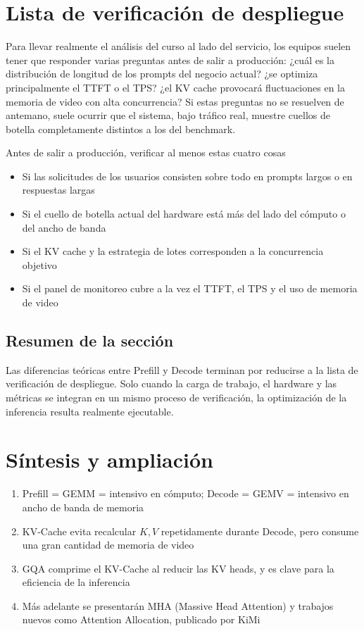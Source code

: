 \documentclass[a4paper]{article}
\begin{document}
\newpage
\section{Lista de verificación de despliegue}
Para llevar realmente el análisis del curso al lado del servicio, los equipos suelen tener que responder varias preguntas antes de salir a producción: ¿cuál es la distribución de longitud de los prompts del negocio actual? ¿se optimiza principalmente el TTFT o el TPS? ¿el KV cache provocará fluctuaciones en la memoria de video con alta concurrencia? Si estas preguntas no se resuelven de antemano, suele ocurrir que el sistema, bajo tráfico real, muestre cuellos de botella completamente distintos a los del benchmark.

\begin{importantbox}{Antes de salir a producción, verificar al menos estas cuatro cosas}
\begin{itemize}
  \item Si las solicitudes de los usuarios consisten sobre todo en prompts largos o en respuestas largas
  \item Si el cuello de botella actual del hardware está más del lado del cómputo o del ancho de banda
  \item Si el KV cache y la estrategia de lotes corresponden a la concurrencia objetivo
  \item Si el panel de monitoreo cubre a la vez el TTFT, el TPS y el uso de memoria de video
\end{itemize}
\end{importantbox}

\subsection{Resumen de la sección}
Las diferencias teóricas entre Prefill y Decode terminan por reducirse a la lista de verificación de despliegue. Solo cuando la carga de trabajo, el hardware y las métricas se integran en un mismo proceso de verificación, la optimización de la inferencia resulta realmente ejecutable.

\newpage
\section{Síntesis y ampliación}

\begin{enumerate}
  \item Prefill = GEMM = intensivo en cómputo; Decode = GEMV = intensivo en ancho de banda de memoria
  \item KV-Cache evita recalcular $K, V$ repetidamente durante Decode, pero consume una gran cantidad de memoria de video
  \item GQA comprime el KV-Cache al reducir las KV heads, y es clave para la eficiencia de la inferencia
  \item Más adelante se presentarán MHA (Massive Head Attention) y trabajos nuevos como Attention Allocation, publicado por KiMi
\end{enumerate}
\end{document}
